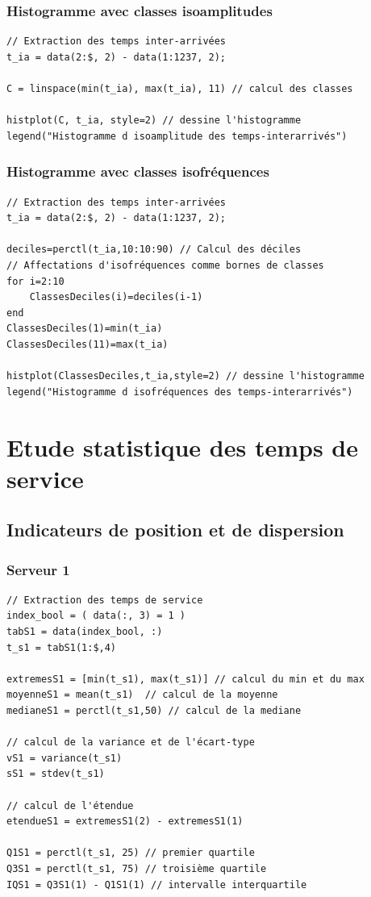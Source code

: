 \documentclass{article}
\begin{document}
\subsubsection{Histogramme avec classes isoamplitudes}
\begin{verbatim}
// Extraction des temps inter-arrivées
t_ia = data(2:$, 2) - data(1:1237, 2);

C = linspace(min(t_ia), max(t_ia), 11) // calcul des classes

histplot(C, t_ia, style=2) // dessine l'histogramme
legend("Histogramme d isoamplitude des temps-interarrivés")
\end{verbatim}
\subsubsection{Histogramme avec classes isofréquences}
\begin{verbatim}
// Extraction des temps inter-arrivées
t_ia = data(2:$, 2) - data(1:1237, 2);

deciles=perctl(t_ia,10:10:90) // Calcul des déciles
// Affectations d'isofréquences comme bornes de classes
for i=2:10
    ClassesDeciles(i)=deciles(i-1)
end
ClassesDeciles(1)=min(t_ia)
ClassesDeciles(11)=max(t_ia)

histplot(ClassesDeciles,t_ia,style=2) // dessine l'histogramme
legend("Histogramme d isofréquences des temps-interarrivés")
\end{verbatim}

\section{Etude statistique des temps de service}

\subsection{Indicateurs de position et de dispersion}

\subsubsection{Serveur 1}
\begin{verbatim}
// Extraction des temps de service
index_bool = ( data(:, 3) = 1 )
tabS1 = data(index_bool, :)
t_s1 = tabS1(1:$,4)

extremesS1 = [min(t_s1), max(t_s1)] // calcul du min et du max
moyenneS1 = mean(t_s1)  // calcul de la moyenne
medianeS1 = perctl(t_s1,50) // calcul de la mediane

// calcul de la variance et de l'écart-type
vS1 = variance(t_s1)
sS1 = stdev(t_s1)

// calcul de l'étendue
etendueS1 = extremesS1(2) - extremesS1(1)

Q1S1 = perctl(t_s1, 25) // premier quartile
Q3S1 = perctl(t_s1, 75) // troisième quartile
IQS1 = Q3S1(1) - Q1S1(1) // intervalle interquartile
\end{verbatim}
\end{document}
